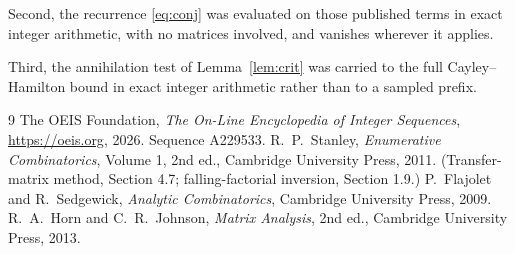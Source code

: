\documentclass[11pt,a4paper]{article}
\theoremstyle{plain}
\theoremstyle{definition}
\begin{document}
Second, the recurrence \eqref{eq:conj} was evaluated on those published terms in exact
integer arithmetic, with no matrices involved, and vanishes wherever it applies.

Third, the annihilation test of Lemma~\ref{lem:crit} was carried to the full
Cayley--Hamilton bound in exact integer arithmetic rather than to a sampled prefix.

\begin{thebibliography}{9}
 The OEIS Foundation, \emph{The On-Line Encyclopedia of Integer
Sequences}, \url{https://oeis.org}, 2026. Sequence A229533.
 R.~P.~Stanley, \emph{Enumerative Combinatorics}, Volume 1, 2nd ed.,
Cambridge University Press, 2011. (Transfer-matrix method, Section 4.7; falling-factorial
inversion, Section 1.9.)
 P.~Flajolet and R.~Sedgewick, \emph{Analytic Combinatorics}, Cambridge
University Press, 2009.
 R.~A.~Horn and C.~R.~Johnson, \emph{Matrix Analysis}, 2nd ed., Cambridge
University Press, 2013.
\end{thebibliography}
\end{document}
